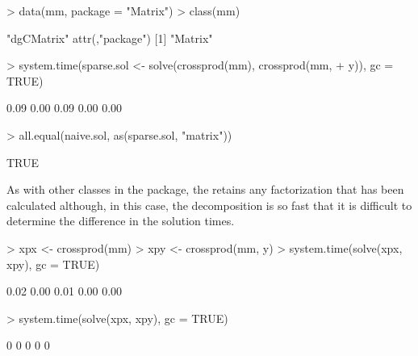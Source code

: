 \documentclass{article}
\begin{document}
\begin{Schunk}
\begin{Sinput}
> data(mm, package = "Matrix")
> class(mm)
\end{Sinput}
\begin{Soutput}
[1] "dgCMatrix"
attr(,"package")
[1] "Matrix"
\end{Soutput}
\begin{Sinput}
> system.time(sparse.sol <- solve(crossprod(mm), crossprod(mm, 
+     y)), gc = TRUE)
\end{Sinput}
\begin{Soutput}
[1] 0.09 0.00 0.09 0.00 0.00
\end{Soutput}
\begin{Sinput}
> all.equal(naive.sol, as(sparse.sol, "matrix"))
\end{Sinput}
\begin{Soutput}
[1] TRUE
\end{Soutput}
\end{Schunk}

As with other classes in the  package, the
 retains any factorization that has been calculated
although, in this case, the decomposition is so fast that it is
difficult to determine the difference in the solution times.

\begin{Schunk}
\begin{Sinput}
> xpx <- crossprod(mm)
> xpy <- crossprod(mm, y)
> system.time(solve(xpx, xpy), gc = TRUE)
\end{Sinput}
\begin{Soutput}
[1] 0.02 0.00 0.01 0.00 0.00
\end{Soutput}
\begin{Sinput}
> system.time(solve(xpx, xpy), gc = TRUE)
\end{Sinput}
\begin{Soutput}
[1] 0 0 0 0 0
\end{Soutput}
\end{Schunk}


\end{document}
